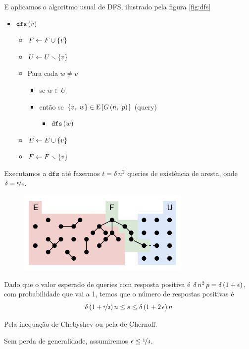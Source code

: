 E aplicamos o algoritmo usual de DFS, ilustrado pela figura \autoref{fig:dfs}
\begin{itemize}[label={}]
  \item $\texttt{dfs}\left(v\vphantom{1j}\right)$
  \begin{itemize}[label={}]
    \item $F\leftarrow F\cup\left\{v\vphantom{1j}\right\}$
    \item $U\leftarrow U\setminus\left\{v\vphantom{1j}\right\}$
    \item Para cada $w\neq v$
    \begin{itemize}[label={}]
      \item se $w\in U$
      \item então se $\left\{v,\ w\vphantom{1j}\right\}\in\mathrm{E}\left[G\left(n,\ p\vphantom{1j}\right)\vphantom{1j}\right]$ (query)
      \begin{itemize}[label={}]
        \item $\texttt{dfs}\left(w\vphantom{1j}\right)$
      \end{itemize}
    \end{itemize}
    \item $E\leftarrow E\cup\left\{v\vphantom{1j}\right\}$
    \item $F\leftarrow F\setminus\left\{v\vphantom{1j}\right\}$
  \end{itemize}
\end{itemize}

Executamos a $\texttt{dfs}$ até fazermos $t=\delta\,n^2$ queries de existência de aresta, onde $\delta=\nicefrac{\epsilon}{4}$.

\begin{figure}
  \label{fig:dfs}
  \includegraphics[width=0.75\textwidth]{aulas/10_17/dfs.png}
\end{figure}

\begin{observacao}
  Dado que o valor esperado de queries com resposta positiva é $\delta\,n^2\,p=\delta\left(1+\epsilon\vphantom{1j}\right)$, com probabilidade que vai a 1, temos que o número de respostas positivas é
  \[
    \delta\left(1+\nicefrac{\epsilon}{2}\vphantom{1j}\right)n \leq s \leq \delta\left(1+2\,\epsilon\vphantom{1j}\right)n
  \]
  
  Pela inequação de Chebyshev ou pela de Chernoff.
  
  Sem perda de generalidade, assumiremos $\epsilon\leq\nicefrac{1}{4}$.
\end{observacao}

